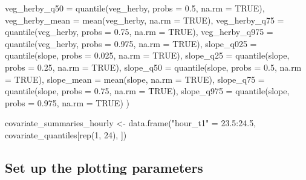 \documentclass[
  letterpaper,
  DIV=11,
  numbers=noendperiod]{scrartcl}
\newenvironment{Shaded}{\begin{snugshade}}{\end{snugshade}}
\newcommand{\AttributeTok}[1]{\textcolor[rgb]{0.40,0.45,0.13}{#1}}
\newcommand{\ConstantTok}[1]{\textcolor[rgb]{0.56,0.35,0.01}{#1}}
\newcommand{\DecValTok}[1]{\textcolor[rgb]{0.68,0.00,0.00}{#1}}
\newcommand{\FloatTok}[1]{\textcolor[rgb]{0.68,0.00,0.00}{#1}}
\newcommand{\FunctionTok}[1]{\textcolor[rgb]{0.28,0.35,0.67}{#1}}
\newcommand{\NormalTok}[1]{\textcolor[rgb]{0.00,0.23,0.31}{#1}}
\newcommand{\OtherTok}[1]{\textcolor[rgb]{0.00,0.23,0.31}{#1}}
\newcommand{\SpecialCharTok}[1]{\textcolor[rgb]{0.37,0.37,0.37}{#1}}
\newcommand{\StringTok}[1]{\textcolor[rgb]{0.13,0.47,0.30}{#1}}
\begin{document}
\begin{Shaded}
\begin{Highlighting}[]
    \AttributeTok{veg\_herby\_q50 =} \FunctionTok{quantile}\NormalTok{(veg\_herby, }\AttributeTok{probs =} \FloatTok{0.5}\NormalTok{, }\AttributeTok{na.rm =} \ConstantTok{TRUE}\NormalTok{),}
    \AttributeTok{veg\_herby\_mean =} \FunctionTok{mean}\NormalTok{(veg\_herby, }\AttributeTok{na.rm =} \ConstantTok{TRUE}\NormalTok{),}
    \AttributeTok{veg\_herby\_q75 =} \FunctionTok{quantile}\NormalTok{(veg\_herby, }\AttributeTok{probs =} \FloatTok{0.75}\NormalTok{, }\AttributeTok{na.rm =} \ConstantTok{TRUE}\NormalTok{),}
    \AttributeTok{veg\_herby\_q975 =} \FunctionTok{quantile}\NormalTok{(veg\_herby, }\AttributeTok{probs =} \FloatTok{0.975}\NormalTok{, }\AttributeTok{na.rm =} \ConstantTok{TRUE}\NormalTok{),}
    \AttributeTok{slope\_q025 =} \FunctionTok{quantile}\NormalTok{(slope, }\AttributeTok{probs =} \FloatTok{0.025}\NormalTok{, }\AttributeTok{na.rm =} \ConstantTok{TRUE}\NormalTok{),}
    \AttributeTok{slope\_q25 =} \FunctionTok{quantile}\NormalTok{(slope, }\AttributeTok{probs =} \FloatTok{0.25}\NormalTok{, }\AttributeTok{na.rm =} \ConstantTok{TRUE}\NormalTok{),}
    \AttributeTok{slope\_q50 =} \FunctionTok{quantile}\NormalTok{(slope, }\AttributeTok{probs =} \FloatTok{0.5}\NormalTok{, }\AttributeTok{na.rm =} \ConstantTok{TRUE}\NormalTok{),}
    \AttributeTok{slope\_mean =} \FunctionTok{mean}\NormalTok{(slope, }\AttributeTok{na.rm =} \ConstantTok{TRUE}\NormalTok{),}
    \AttributeTok{slope\_q75 =} \FunctionTok{quantile}\NormalTok{(slope, }\AttributeTok{probs =} \FloatTok{0.75}\NormalTok{, }\AttributeTok{na.rm =} \ConstantTok{TRUE}\NormalTok{),}
    \AttributeTok{slope\_q975 =} \FunctionTok{quantile}\NormalTok{(slope, }\AttributeTok{probs =} \FloatTok{0.975}\NormalTok{, }\AttributeTok{na.rm =} \ConstantTok{TRUE}\NormalTok{)}
\NormalTok{  )}

\NormalTok{covariate\_summaries\_hourly }\OtherTok{\textless{}{-}} \FunctionTok{data.frame}\NormalTok{(}\StringTok{"hour\_t1"} \OtherTok{=} \FloatTok{23.5}\SpecialCharTok{:}\FloatTok{24.5}\NormalTok{, covariate\_quantiles[}\FunctionTok{rep}\NormalTok{(}\DecValTok{1}\NormalTok{, }\DecValTok{24}\NormalTok{), ])}
\end{Highlighting}
\end{Shaded}

\subsection{Set up the plotting
parameters}\label{set-up-the-plotting-parameters}
\end{document}
